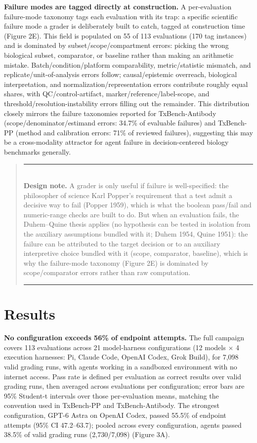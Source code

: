 \documentclass[11pt]{article}
\begin{document}
\textbf{Failure modes are tagged directly at construction.} A per-evaluation failure-mode taxonomy tags each evaluation with its trap: a specific scientific failure mode a grader is deliberately built to catch, tagged at construction time (Figure 2E). This field is populated on 55 of 113 evaluations (170 tag instances) and is dominated by subset/scope/compartment errors: picking the wrong biological subset, comparator, or baseline rather than making an arithmetic mistake. Batch/condition/platform comparability, metric/statistic mismatch, and replicate/unit-of-analysis errors follow; causal/epistemic overreach, biological interpretation, and normalization/representation errors contribute roughly equal shares, with QC/control-artifact, marker/reference/label-scope, and threshold/resolution-instability errors filling out the remainder. This distribution closely mirrors the failure taxonomies reported for TxBench-Antibody (scope/denominator/estimand errors: 34.7\% of evaluable failures) and TxBench-PP (method and calibration errors: 71\% of reviewed failures), suggesting this may be a cross-modality attractor for agent failure in decision-centered biology benchmarks generally.
\begin{quote}
\noindent\rule{\linewidth}{0.4pt}\\[2pt]
\textbf{Design note.} A grader is only useful if failure is well-specified: the philosopher of science Karl Popper's requirement that a test admit a decisive way to fail (Popper 1959), which is what the boolean pass/fail and numeric-range checks are built to do. But when an evaluation fails, the Duhem--Quine thesis applies (no hypothesis can be tested in isolation from the auxiliary assumptions bundled with it; Duhem 1954, Quine 1951): the failure can be attributed to the target decision or to an auxiliary interpretive choice bundled with it (scope, comparator, baseline), which is why the failure-mode taxonomy (Figure 2E) is dominated by scope/comparator errors rather than raw computation.\\[2pt]\rule{\linewidth}{0.4pt}
\end{quote}
\section{Results}
\textbf{No configuration exceeds 56\% of endpoint attempts.} The full campaign covers 113 evaluations across 21 model-harness configurations (12 models $\times$ 4 execution harnesses: Pi, Claude Code, OpenAI Codex, Grok Build), for 7,098 valid grading runs, with agents working in a sandboxed environment with no internet access. Pass rate is defined per evaluation as correct results over valid grading runs, then averaged across evaluations per configuration; error bars are 95\% Student-t intervals over those per-evaluation means, matching the convention used in TxBench-PP and TxBench-Antibody. The strongest configuration, GPT-6 Astra on OpenAI Codex, passed 55.5\% of endpoint attempts (95\% CI 47.2--63.7); pooled across every configuration, agents passed 38.5\% of valid grading runs (2,730/7,098) (Figure 3A).
\end{document}
